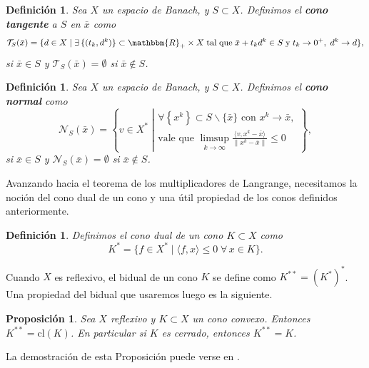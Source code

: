 \documentclass[a4paper,10pt]{book}
\newcommand{\R}{\mathbbm{R}}
\newcommand{\arr}{\rightarrow}
\newcommand{\bx}{\bar{x}}
\newcommand{\cN}{\mathcal{N}}
\newcommand{\cT}{\mathcal{T}}
\newtheorem{prop}[teo]{Proposici\'on}
\newtheorem{defi}[teo]{Definici\'on}
\begin{document}
\begin{defi}
Sea $X$ un espacio de Banach, y $S\subset X$. Definimos el \textbf{cono tangente} a $S$ en $\bx$ como
$$\cT_{S} (\bx)=\{d\in X\mid\exists\,\{(t_{k},d^k)\}\subset\R_+\times X\;\mathrm{tal\; que}\;\bx+t_{k}d^k\in S\;\mathrm{y}\;t_{k}\arr 0^+,\;d^k\arr d\},$$ si $\bx\in S$ y $\cT_{S}(\bx)=\emptyset$ si $\bx\notin S$.
\end{defi}

\begin{defi}
Sea $X$ un espacio de Banach, y $S\subset X$. Definimos el \textbf{cono normal} como 
$$\cN_{S}(\bx)=\left\{v\in X^*\;\left|\begin{array}{c}
\forall\left\{x^k\right\}\subset S\backslash\{\bx\}\mbox{ con } x^k\arr\bx,\\
\mbox{vale que }\displaystyle\limsup_{k\arr\infty}\frac{\langle v,x^k-\bx\rangle}{\|x^k-\bx\|}\leq 0\end{array}\right.\right\},$$
si $\bx\in S$ y $\mathcal{N}_{S}(\bx)=\emptyset$ si $\bx\notin S$.
\end{defi}

Avanzando hacia el teorema de los multiplicadores de Langrange, necesitamos la noción del cono dual de un cono y una útil propiedad de los conos definidos anteriormente.

\begin{defi}
 Definimos el cono dual de un cono  $K\subset X$ como
$$K^*=\{f\in X^*\mid\langle f,x\rangle\leq 0\;\forall\,x\in K\}.$$
\end{defi}

Cuando $X$ es reflexivo, el bidual de un cono $K$ se define como $K^{**}=(K^*)^*$. Una propiedad del bidual que usaremos luego es la siguiente.
\begin{prop}\label{conobidual}
 Sea $X$ reflexivo y $K\subset X$ un cono convexo. Entonces $K^{**}=\mathrm{cl}(K)$. En particular si $K$ es cerrado, entonces $K^{**}=K$.
\end{prop}
La demostración de esta Proposición puede verse en \cite[Proposition 2.40]{bonnans2013perturbation}.
\end{document}

